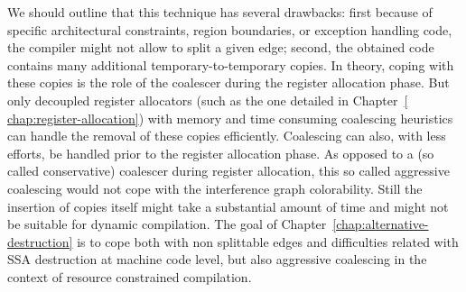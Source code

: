 {We should outline that this technique has several drawbacks: first because of specific architectural constraints, region boundaries, or exception handling code, the compiler might not allow to split a given edge; second, the obtained code contains many additional temporary-to-temporary copies. In theory, coping with these copies is the role of the coalescer during the register allocation phase. But only decoupled register allocators (such as the one detailed in Chapter~\ref{ chap:register-allocation}) with memory and time consuming coalescing heuristics can handle the removal of these copies efficiently. Coalescing can also, with less efforts, be handled prior to the register allocation phase. As opposed to a (so called conservative) coalescer during register allocation, this so called aggressive coalescing would not cope with the interference graph colorability. Still the insertion of copies itself might take a substantial amount of time and might not be suitable for dynamic compilation. The goal of Chapter~\ref{chap:alternative-destruction} is to cope both with non splittable edges and difficulties related with SSA destruction at machine code level, but also aggressive coalescing in the context of resource constrained compilation.

}
